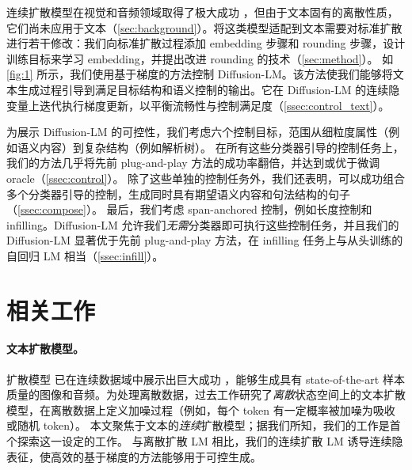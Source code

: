 \documentclass{article}
\begin{document}
连续扩散模型在视觉和音频领域取得了极大成功 \cite{ho2020denoising,kong2020diffwave,ramesh2022hierarchical,dhariwal2021diffusion,chen2021wavegrad}，但由于文本固有的离散性质，它们尚未应用于文本（\cref{sec:background}）。将这类模型适配到文本需要对标准扩散进行若干修改：我们向标准扩散过程添加 embedding 步骤和 rounding 步骤，设计训练目标来学习 embedding，并提出改进 rounding 的技术（\cref{sec:method}）。
如 \cref{fig:1} 所示，我们使用基于梯度的方法控制 Diffusion-LM。该方法使我们能够将文本生成过程引导到满足目标结构和语义控制的输出。它在 Diffusion-LM 的连续隐变量上迭代执行梯度更新，以平衡流畅性与控制满足度（\cref{ssec:control_text}）。%

为展示 Diffusion-LM 的可控性，我们考虑六个控制目标，范围从细粒度属性（例如语义内容）到复杂结构（例如解析树）。
在所有这些分类器引导的控制任务上，我们的方法几乎将先前 plug-and-play 方法的成功率翻倍，并达到或优于微调 oracle（\cref{ssec:control}）。
除了这些单独的控制任务外，我们还表明，可以成功组合多个分类器引导的控制，生成同时具有期望语义内容和句法结构的句子（\cref{ssec:compose}）。
最后，我们考虑 span-anchored 控制，例如长度控制和 infilling。Diffusion-LM 允许我们\emph{无需}分类器即可执行这些控制任务，并且我们的 Diffusion-LM 显著优于先前 plug-and-play 方法，在 infilling 任务上与从头训练的自回归 LM 相当（\cref{ssec:infill}）。

\section{相关工作}
\label{sec:related_work}


\paragraph{文本扩散模型。}
扩散模型 \cite{pmlr-v37-sohl-dickstein15} 已在连续数据域中展示出巨大成功 \cite{ho2020denoising,nichol2021improved, kong2020diffwave, Mittal2021Music}，能够生成具有 state-of-the-art 样本质量的图像和音频。为处理离散数据，过去工作研究了\emph{离散}状态空间上的文本扩散模型，在离散数据上定义加噪过程（例如，每个 token 有一定概率被加噪为吸收或随机 token）\cite{austin2021structured,hoogeboom2021argmax,hoogeboom2022autoregressive}。
本文聚焦于文本的\emph{连续}扩散模型；据我们所知，我们的工作是首个探索这一设定的工作。
与离散扩散 LM 相比，我们的连续扩散 LM 诱导连续隐表征，使高效的基于梯度的方法能够用于可控生成。
\end{document}
